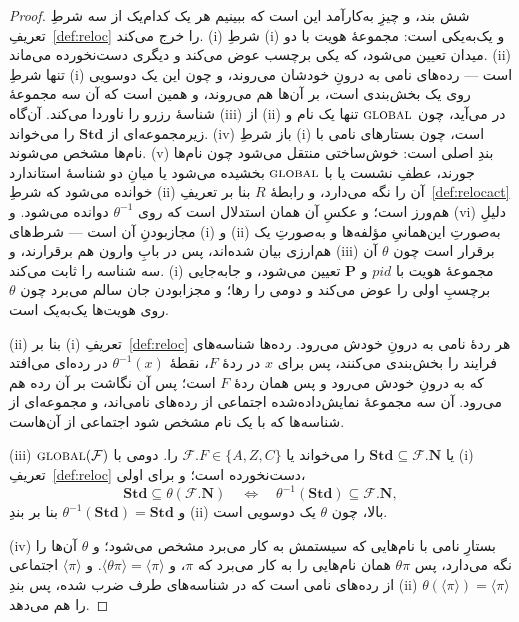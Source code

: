\documentclass[10pt,oneside,openany]{book}
\newcommand{\Ps}{\mathbf{P}}
\newcommand{\PID}{\mathit{pid}}
\newcommand{\admits}{\mathbf{N}}
\newcommand{\Stdpid}{\mathbf{Std}}
\newcommand{\F}{\mathcal{F}}
\newcommand{\op}[1]{\textnormal{\textsc{#1}}}
\newcommand{\ncl}[1]{\langle #1 \rangle}
\theoremstyle{accentdef}
\theoremstyle{accentplain}
\begin{document}
\begin{proof}
شش بند، و چیزِ به‌کارآمد این است که ببینیم هر یک کدام‌یک از سه شرطِ
تعریفِ~\ref{def:reloc} را خرج می‌کند. (i) شرطِ (i) و یک‌به‌یکی است: مجموعهٔ
هویت با دو میدان تعیین می‌شود، که یکی برچسب عوض می‌کند و دیگری دست‌نخورده
می‌ماند. (ii) تنها شرطِ (i) است --- رده‌های نامی به درونِ خودشان می‌روند، و
چون این یک دوسویی روی یک بخش‌بندی است، بر آن‌ها هم می‌روند، و همین است که آن
سه مجموعهٔ شناسهٔ رزرو را ناوردا می‌کند. آن‌گاه (iii) از (ii) در می‌آید، چون
$\op{global}$ تنها یک نام و زیرمجموعه‌ای از $\Stdpid$ را می‌خواند. (iv) باز
شرطِ (i) است، چون بستارهای نامی با نام‌ها مشخص می‌شوند. (v) بندِ اصلی است:
خوش‌ساختی منتقل می‌شود چون نام‌ها جورند، عطفِ نشست یا با $\op{global}$
بخشیده می‌شود یا میانِ دو شناسهٔ استاندارد خوانده می‌شود که شرطِ (ii) آن را
نگه می‌دارد، و رابطهٔ $R$ بنا بر تعریفِ~\ref{def:relocact} هم‌ورز است؛ و عکسِ
آن همان استدلال است که روی $\theta^{-1}$ دوانده می‌شود. و (vi) دلیلِ مجازبودنِ
آن است --- شرط‌های (i) و (ii) به‌صورتِ این‌همانیِ مؤلفه‌ها و به‌صورتِ یک
هم‌ارزی بیان شده‌اند، پس در بابِ وارون هم برقرارند، و (iii) برقرار است چون
$\theta$ آن سه شناسه را ثابت می‌کند.
(i) مجموعهٔ هویت با $\PID$ و $\Ps$ تعیین می‌شود، و جابه‌جایی برچسبِ اولی را
عوض می‌کند و دومی را رها؛ و مجزابودن جان سالم می‌برد چون $\theta$ روی
هویت‌ها یک‌به‌یک است.

(ii) بنا بر (i)ِ تعریفِ~\ref{def:reloc} هر ردهٔ نامی به درونِ خودش می‌رود.
رده‌ها شناسه‌های فرایند را بخش‌بندی می‌کنند، پس برای $x$ در ردهٔ $F$، نقطهٔ
$\theta^{-1}(x)$ در رده‌ای می‌افتد که به درونِ خودش می‌رود و پس همان ردهٔ $F$
است؛ پس آن نگاشت بر آن رده هم می‌رود. آن سه مجموعهٔ نمایش‌داده‌شده اجتماعی از
رده‌های نامی‌اند، و مجموعه‌ای از شناسه‌ها که با یک نام مشخص شود اجتماعی از
آن‌هاست.

(iii) $\op{global}(\F)$ یا $\Stdpid \subseteq \F.\admits$ را می‌خواند یا
$\F.F \in \{A,Z,C\}$ را. دومی با (i)ِ تعریفِ~\ref{def:reloc} دست‌نخورده
است؛ و برای اولی،
\[
  \Stdpid \subseteq \theta(\F.\admits)
  \quad\iff\quad
  \theta^{-1}(\Stdpid) \subseteq \F.\admits ,
\]
و $\theta^{-1}(\Stdpid) = \Stdpid$ بنا بر بندِ (ii)ِ بالا، چون $\theta$ یک
دوسویی است.

(iv) بستارِ نامی با نام‌هایی که سیستمش به کار می‌برد مشخص می‌شود؛ و
$\theta$ آن‌ها را نگه می‌دارد، پس $\theta\pi$ همان نام‌هایی را به کار
می‌برد که $\pi$، و $\ncl{\theta\pi} = \ncl{\pi}$. و $\ncl{\pi}$ اجتماعی از
رده‌های نامی است که در شناسه‌های طرف ضرب شده، پس بندِ (ii) $\theta(\ncl{\pi})
= \ncl{\pi}$ را هم می‌دهد.


\end{proof}
\end{document}
